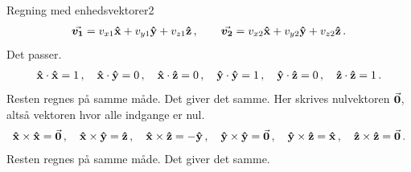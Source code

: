 \begin{opgave}{Regning med enhedsvektorer}{2}
	\opg
	\begin{align*}
	\v{v_1} = v_{x1}\xhat+v_{y1}\yhat+v_{z1}\zhat \, , \qquad 
	\v{v_2} = v_{x2}\xhat+v_{y2}\yhat+v_{z2}\zhat \, .
	\end{align*}
	\opg Det passer.
	\opg
	\begin{align*}
	\xhat\cdot\xhat = 1 \, , \quad
	\xhat\cdot\yhat = 0 \, , \quad
	\xhat\cdot\zhat = 0 \, , \quad
	\yhat\cdot\yhat = 1 \, , \quad
	\yhat\cdot\zhat = 0 \, , \quad
	\zhat\cdot\zhat = 1 \, .
	\end{align*}
	Resten regnes på samme måde.
	\opg Det giver det samme.
	\opg Her skrives nulvektoren $\v{0}$, altså vektoren hvor alle indgange er nul.
	\begin{align*}
	\xhat\times\xhat = \v{0} \, , \quad 
	\xhat\times\yhat = \zhat \, , \quad
	\xhat\times\zhat = -\yhat \, , \quad
	\yhat\times\yhat = \v{0} \, , \quad
	\yhat\times\zhat = \xhat \, , \quad
	\zhat\times\zhat = \v{0} \, .
	\end{align*}
	Resten regnes på samme måde.
	\opg Det giver det samme.
\end{opgave}
